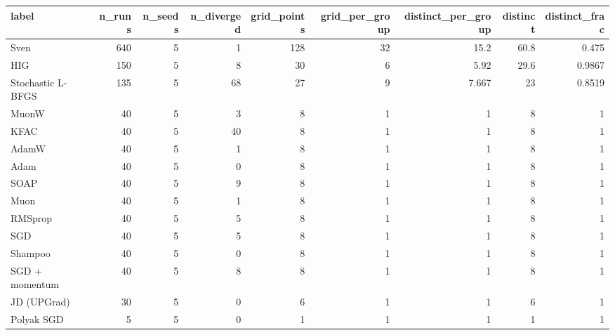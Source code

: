 \begin{tabular}{lrrrrrrrr}
\toprule
label & n\_runs & n\_seeds & n\_diverged & grid\_points & grid\_per\_group & distinct\_per\_group & distinct & distinct\_frac \\
\midrule
Sven & 640 & 5 & 1 & 128 & 32 & 15.2 & 60.8 & 0.475 \\
HIG & 150 & 5 & 8 & 30 & 6 & 5.92 & 29.6 & 0.9867 \\
Stochastic L-BFGS & 135 & 5 & 68 & 27 & 9 & 7.667 & 23 & 0.8519 \\
MuonW & 40 & 5 & 3 & 8 & 1 & 1 & 8 & 1 \\
KFAC & 40 & 5 & 40 & 8 & 1 & 1 & 8 & 1 \\
AdamW & 40 & 5 & 1 & 8 & 1 & 1 & 8 & 1 \\
Adam & 40 & 5 & 0 & 8 & 1 & 1 & 8 & 1 \\
SOAP & 40 & 5 & 9 & 8 & 1 & 1 & 8 & 1 \\
Muon & 40 & 5 & 1 & 8 & 1 & 1 & 8 & 1 \\
RMSprop & 40 & 5 & 5 & 8 & 1 & 1 & 8 & 1 \\
SGD & 40 & 5 & 5 & 8 & 1 & 1 & 8 & 1 \\
Shampoo & 40 & 5 & 0 & 8 & 1 & 1 & 8 & 1 \\
SGD + momentum & 40 & 5 & 8 & 8 & 1 & 1 & 8 & 1 \\
JD (UPGrad) & 30 & 5 & 0 & 6 & 1 & 1 & 6 & 1 \\
Polyak SGD & 5 & 5 & 0 & 1 & 1 & 1 & 1 & 1 \\
\bottomrule
\end{tabular}
